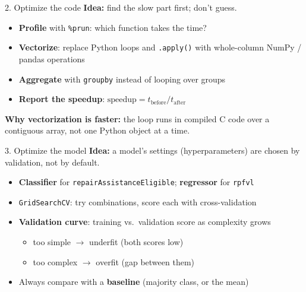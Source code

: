 \documentclass[aspectratio=43,11pt]{beamer}
\begin{document}
\begin{frame}{2. Optimize the code}
  \textbf{Idea:} find the slow part first; don't guess.
  \vspace{0.6em}
  \begin{itemize}
    \item \textbf{Profile} with \texttt{\%prun}: which function takes the time?
    \item \textbf{Vectorize}: replace Python loops and \texttt{.apply()} with
          whole-column NumPy / pandas operations
    \item \textbf{Aggregate} with \texttt{groupby} instead of looping over groups
    \item \textbf{Report the speedup}: $\text{speedup} = t_{\text{before}} / t_{\text{after}}$
  \end{itemize}
  \vspace{0.8em}
  \textbf{Why vectorization is faster:} the loop runs in compiled C code
  over a contiguous array, not one Python object at a time.
\end{frame}

\begin{frame}{3. Optimize the model}
  \textbf{Idea:} a model's settings (hyperparameters) are chosen by
  validation, not by default.
  \vspace{0.6em}
  \begin{itemize}
    \item \textbf{Classifier} for \texttt{repairAssistanceEligible};
          \textbf{regressor} for \texttt{rpfvl}
    \item \texttt{GridSearchCV}: try combinations, score each with cross-validation
    \item \textbf{Validation curve}: training vs.\ validation score as complexity grows
      \begin{itemize}
        \item too simple $\rightarrow$ underfit (both scores low)
        \item too complex $\rightarrow$ overfit (gap between them)
      \end{itemize}
    \item Always compare with a \textbf{baseline}
          (majority class, or the mean)
  \end{itemize}
\end{frame}
\end{document}
